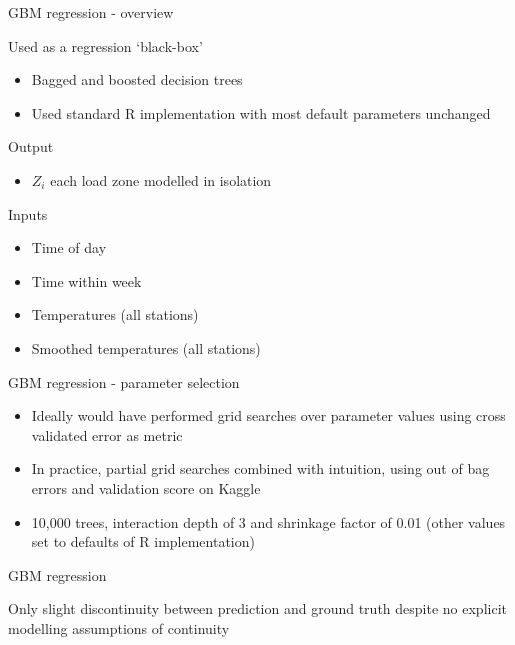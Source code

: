 \begin{frame}{GBM regression - overview}
  \begin{block}{Used as a regression `black-box'}
    \begin{itemize}
      \item Bagged and boosted decision trees
      \item Used standard R implementation with most default parameters unchanged
    \end{itemize}
  \end{block}
  \begin{block}{Output}
  	\begin{itemize}
      \item $Z_i$ \ie each load zone modelled in isolation
    \end{itemize}
  \end{block}
  \begin{block}{Inputs}
    \begin{itemize}
      \item Time of day
      \item Time within week
      \item Temperatures (all stations)
      \item Smoothed temperatures (all stations)
    \end{itemize}
  \end{block}
\end{frame}

\begin{frame}{GBM regression - parameter selection}
  \begin{itemize}
    \item Ideally would have performed grid searches over parameter values using cross validated error as metric
    \vspace{\baselineskip}
    \item In practice, partial grid searches combined with intuition, using out of bag errors and validation score on Kaggle
    \vspace{\baselineskip}
    \item 10,000 trees, interaction depth of 3 and shrinkage factor of 0.01 (other values set to defaults of R implementation)
  \end{itemize}
\end{frame}

\begin{frame}{GBM regression}
  \begin{centering}
    
    Only slight discontinuity between prediction and ground truth despite no explicit modelling assumptions of continuity
  \end{centering}
\end{frame}

